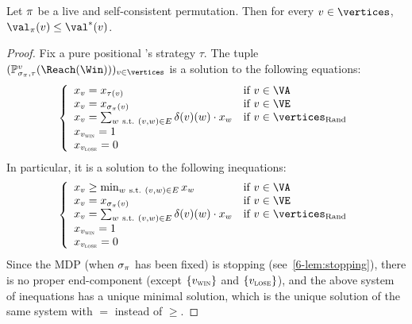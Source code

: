 \begin{lemma}
  Let $\pi$ be a live and self-consistent permutation.  Then for
  every $v \in \vertices$,  $\val_\perm(v) \le \val^*(v)$.
\end{lemma}

\begin{proof}
  Fix a pure positional \Adam's strategy $\tau$. The tuple
  $(\probm_{\sigma_\perm,\tau}^v(\Reach(\Win)))_{v \in \vertices}$ is
  a
  solution to the following equations:
  \[
  \left\{\begin{array}{ll} x_v =
      x_{\tau(v)} & \text{if}\ v \in \Adamvertices \\
      x_v = x_{\sigma_\perm(v)} & \text{if}\ v \in \Evevertices \\
      x_v = \sum_{w\ \text{s.t.}\ (v,w) \in E} \delta(v)(w) \cdot
      x_w  & \text{if}\ v \in \Randomvertices \\
      x_{\vwin} = 1 \\
      x_{\vlose} = 0
    \end{array}\right.
  \]
  In particular, it is a solution to the following inequations:
  \[
  \left\{\begin{array}{ll} 
      x_v \ge \min_{w\ \text{s.t.}\ (v,w) \in E}
      x_w & \text{if}\ v \in \Adamvertices \\
      x_v = x_{\sigma_\perm(v)}  & \text{if}\ v \in \Evevertices \\
      x_v = \sum_{w\ \text{s.t.}\ (v,w) \in E} \delta(v)(w) \cdot x_w
      & \text{if}\ v \in \Randomvertices \\
      x_{\vwin} = 1 \\
      x_{\vlose} = 0
    \end{array}\right.
  \]
  Since the MDP (when $\sigma_\pi$ has been fixed) is stopping (see~\cref{6-lem:stopping}), there is no proper end-component
  (except $\{v_{\textsc{win}}\}$ and $\{v_{\textsc{lose}}\}$), and the above system of
  inequations has a unique minimal solution, which is the unique
  solution of the same system with $=$ instead of $\ge$.


\end{proof}
